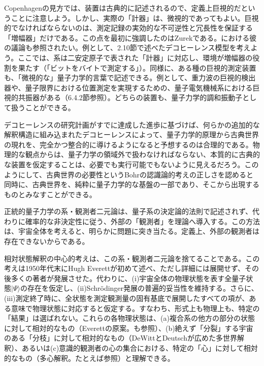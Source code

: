 Copenhagenの見方では、装置は古典的に記述されるので、定義上巨視的だということに注意しよう。しかし、実際の「計器」は、微視的であってもよい。巨視的でなければならないのは、測定記録の実効的な不可逆性と冗長性を保証する「増幅器」だけである。この点を最初に強調したのはZurek\cite{ref076}である。\cite{ref016,ref323,ref389}における彼の議論も参照されたい。例として、2.10節で述べたデコヒーレンス模型を考えよう。ここでは、系は二安定原子で表された「計器」に対応し、環境が増幅器の役割を果たす（「ビットをバイトで測定する」）。同様に、ある種の巨視的測定装置も、「微視的な」量子力学的言葉で記述できる。例として、重力波の巨視的検出器\cite{ref069}や、量子限界における位置測定\cite{ref310}を実現するための、量子電気機械系\cite{ref307}における巨視的共振器がある（6.4.2節参照）。どちらの装置も、量子力学的調和振動子として扱うことができる。

デコヒーレンスの研究計画がすでに達成した進歩に基づけば、何らかの追加的な解釈構造に組み込まれたデコヒーレンスによって、量子力学的原理から古典世界の現れを、完全かつ整合的に導けるようになると予想するのは合理的である。物理的な観点からは、量子力学の領域外で扱わなければならない、本質的に古典的な装置を仮定することは、必要でも実行可能でもないように見えるだろう。このようにして、古典世界の必要性というBohrの認識論的考えの正しさを認めると同時に、古典世界を、純粋に量子力学的な基盤の一部であり、そこから出現するものとみなすことができる\cite{ref067,ref104,ref388,ref391}。

正統的量子力学の系・観測者二元論は、量子系の決定論的法則で記述されず、代わりに確率的な非決定性に従う、外部の「観測者」を理論へ導入する。この方法は、宇宙全体を考えると、明らかに問題に突き当たる。定義上、外部の観測者は存在できないからである。


\hypertarget{srcpage:337}{}\label{srcpage:337}
相対状態解釈の中心的考えは、この系・観測者二元論を捨てることである。この考えは1950年代末にHugh Everett\cite{ref140}が初めて述べ、ただし詳細には展開せず、その後多くの著者が発展させた。代わりに、(i)宇宙全体の物理状態を表す全量子状態$|\Psi\rangle$の存在を仮定し、(ii)Schrödinger発展の普遍的妥当性を維持する。さらに、(iii)測定終了時に、全状態を測定観測量の固有基底で展開したすべての項が、ある意味で物理状態に対応すると仮定する。すなわち、形式上も物理上も、特定の「結果」は選ばれない。これらの各物理状態は、(a)複合系の他方の部分の状態に対して相対的なもの（Everettの原案。\cite{ref141,ref143}も参照）、(b)絶えず「分裂」する宇宙のある「分枝」に対して相対的なもの（DeWitt\cite{ref397}とDeutsch\cite{ref398}が広めた多世界解釈）、あるいは(c)意識的観測者の心の集合における、特定の「心」に対して相対的なもの（多心解釈。たとえば\cite{ref399}参照）と理解できる。

